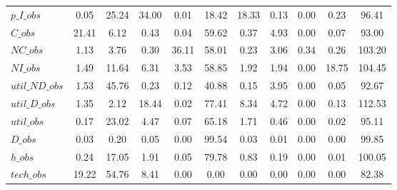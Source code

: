 \begin{center}
\begin{longtable}{lcccccccccc}
$p\_I\_obs      $	 & 	                0.05	 & 	               25.24	 & 	               34.00	 & 	                0.01	 & 	               18.42	 & 	               18.33	 & 	                0.13	 & 	                0.00	 & 	                0.23	 & 	               96.41 \\ 
$C\_obs         $	 & 	               21.41	 & 	                6.12	 & 	                0.43	 & 	                0.04	 & 	               59.62	 & 	                0.37	 & 	                4.93	 & 	                0.00	 & 	                0.07	 & 	               93.00 \\ 
$NC\_obs        $	 & 	                1.13	 & 	                3.76	 & 	                0.30	 & 	               36.11	 & 	               58.01	 & 	                0.23	 & 	                3.06	 & 	                0.34	 & 	                0.26	 & 	              103.20 \\ 
$NI\_obs        $	 & 	                1.49	 & 	               11.64	 & 	                6.31	 & 	                3.53	 & 	               58.85	 & 	                1.92	 & 	                1.94	 & 	                0.00	 & 	               18.75	 & 	              104.45 \\ 
$util\_ND\_obs  $	 & 	                1.53	 & 	               45.76	 & 	                0.23	 & 	                0.12	 & 	               40.88	 & 	                0.15	 & 	                3.95	 & 	                0.00	 & 	                0.05	 & 	               92.67 \\ 
$util\_D\_obs   $	 & 	                1.35	 & 	                2.12	 & 	               18.44	 & 	                0.02	 & 	               77.41	 & 	                8.34	 & 	                4.72	 & 	                0.00	 & 	                0.13	 & 	              112.53 \\ 
$util\_obs      $	 & 	                0.17	 & 	               23.02	 & 	                4.47	 & 	                0.07	 & 	               65.18	 & 	                1.71	 & 	                0.46	 & 	                0.00	 & 	                0.02	 & 	               95.11 \\ 
$D\_obs         $	 & 	                0.03	 & 	                0.20	 & 	                0.05	 & 	                0.00	 & 	               99.54	 & 	                0.03	 & 	                0.01	 & 	                0.00	 & 	                0.00	 & 	               99.85 \\ 
$h\_obs         $	 & 	                0.24	 & 	               17.05	 & 	                1.91	 & 	                0.05	 & 	               79.78	 & 	                0.83	 & 	                0.19	 & 	                0.00	 & 	                0.01	 & 	              100.05 \\ 
$tech\_obs      $	 & 	               19.22	 & 	               54.76	 & 	                8.41	 & 	                0.00	 & 	                0.00	 & 	                0.00	 & 	                0.00	 & 	                0.00	 & 	                0.00	 & 	               82.38 \\ 
\end{longtable}
 \end{center}
